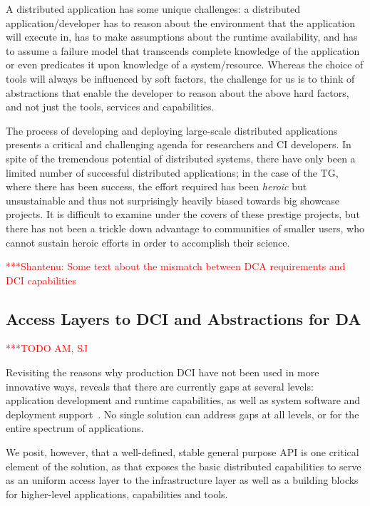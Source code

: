\documentclass[a4paper,12pt]{article}
\newcommand{\todo}[1]{     {\textcolor{red}  { ***TODO      #1 }}}
\newcommand{\jhanote}[1]{  {\textcolor{red}  { ***Shantenu: #1 }}}
\newcommand{\todo}[1]{}
\newcommand{\jhanote}[1]{}
\begin{document}
 A distributed application has some unique challenges: a distributed
 application/developer has to reason about the environment that the
 application will execute in, has to make assumptions about the
 runtime availability, and has to assume a failure model that
 transcends complete knowledge of the application or even predicates
 it upon knowledge of a system/resource.  Whereas the choice of tools
 will always be influenced by soft factors, the challenge for us is to
 think of abstractions that enable the developer to reason about the
 above hard factors, and not just the tools, services and
 capabilities.

 The process of developing and deploying large-scale distributed
 applications presents a critical and challenging agenda for
 researchers and CI developers.  In spite of the tremendous potential
 of distributed systems, there have only been a limited number of
 successful distributed applications; in the case of the TG, where
 there has been success, the effort required has been {\it heroic} but
 unsustainable and thus not surprisingly heavily biased towards big
 showcase projects. It is difficult to examine under the covers of
 these prestige projects, but there has not been a trickle down
 advantage to communities of smaller users, who cannot sustain heroic
 efforts in order to accomplish their science.


 \jhanote{Some text about the mismatch between DCA requirements and
 DCI capabilities}



% 
\subsection{Access Layers to DCI and Abstractions for DA}\todo{AM, SJ}
\label{ssec.dci.access}

Revisiting the reasons why production DCI have not been used in more
innovative ways, reveals that there are currently gaps at several
levels: application development and runtime capabilities, as well as
system software and deployment support~\cite{dpagrid2009}.  No single
solution can address gaps at all levels, or for the entire spectrum of
applications.  

We posit, however, that a well-defined, stable general purpose API is
one critical element of the solution, as that exposes the basic
distributed capabilities to serve as an uniform access layer to the
infrastructure layer as well as a building blocks for higher-level
applications, capabilities and tools.
\end{document}
